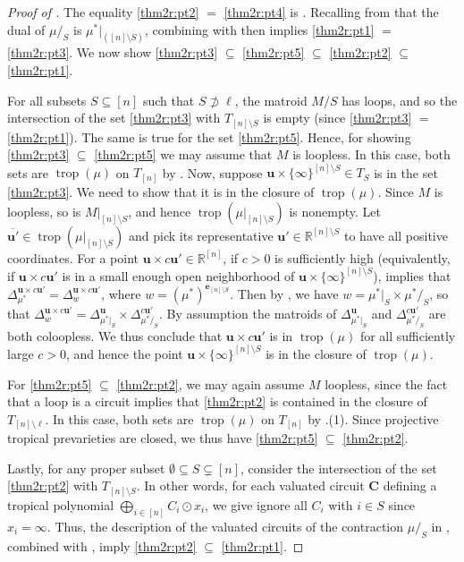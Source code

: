 \documentclass[11pt]{amsart}
\newcommand{\RR}{\mathbb R}
\newcommand{\trop}{\operatorname{trop}}
\newcommand{\be}{\mathbf e}
\newcommand{\bu}{{\mathbf u}}
\theoremstyle{definition}
\begin{document}
\begin{proof}[Proof of ] The equality \ref{thm2r:pt2} $=$ \ref{thm2r:pt4} is \cite[Theorem 3.8]{MT01}.  Recalling from  that the dual of $\mu/_S$ is $\mu^*|_{([n]\setminus S)}$, combining  with  then  implies \ref{thm2r:pt1} $=$ \ref{thm2r:pt3}.
We now show \ref{thm2r:pt3} $\subseteq$ \ref{thm2r:pt5} $\subseteq$ \ref{thm2r:pt2} $\subseteq$ \ref{thm2r:pt1}.

For all subsets $S\subseteq [n]$ such that $S\not\supset\ell$, the matroid $M/S$ has loops, and so the intersection of the set \ref{thm2r:pt3} with $T_{[n]\setminus S}$ is empty (since \ref{thm2r:pt3} $=$ \ref{thm2r:pt1}).  The same is true for the set \ref{thm2r:pt5}.  Hence, for showing \ref{thm2r:pt3} $\subseteq$ \ref{thm2r:pt5} we may assume that $M$ is loopless.  In this case, both sets are $\trop(\mu)$ on $T_{[n]}$ by .  Now, suppose $\bu \times \{\infty\}^{[n]\setminus S} \in T_{S}$ is in the set \ref{thm2r:pt3}.  We need to show that it is in the closure of $\trop(\mu)$.  Since $M$ is loopless, so is $M|_{[n]\setminus S}$, and hence $\trop(\mu|_{[n]\setminus S})$ is nonempty.  Let $\overline{\bu'} \in \trop(\mu|_{[n]\setminus S})$ and pick its representative $\bu'\in \RR^{[n]\setminus S}$ to have all positive coordinates.  For a point $\bu \times c\bu' \in \RR^{[n]}$, if $c>0$ is sufficiently high (equivalently, if $\bu \times c\bu'$ is in a small enough open neighborhood of $\bu \times \{\infty\}^{[n]\setminus S}$),  implies that $\Delta_{\mu^*}^{\bu \times c\bu'} = \Delta_{w}^{\bu \times c\bu'}$, where $w = (\mu^*)^{\be_{[n]\setminus S}}$.  Then by , we have $w = \mu^*|_S \times \mu^*/_S$, so that $\Delta_{w}^{\bu \times c\bu'} = \Delta_{\mu^*|_S}^{\bu} \times \Delta_{\mu^*/_S}^{c\bu'}$.  By assumption the matroids of $\Delta_{\mu^*|_S}^{\bu}$ and $\Delta_{\mu^*/_S}^{c\bu'}$ are both coloopless.  We thus conclude that $\bu\times c\bu'$ is in $\trop(\mu)$ for all sufficiently large $c>0$, and hence the point $\bu \times \{\infty\}^{[n]\setminus S}$ is in the closure of $\trop(\mu)$.

For \ref{thm2r:pt5} $\subseteq$ \ref{thm2r:pt2}, we may again assume $M$ loopless, since the fact that a loop is a circuit implies that \ref{thm2r:pt2} is contained in the closure of $T_{[n]\setminus \ell}$.  In this case, both sets are $\trop(\mu)$ on $T_{[n]}$ by .(1).  Since projective tropical prevarieties are closed, we thus have \ref{thm2r:pt5} $\subseteq$ \ref{thm2r:pt2}.

Lastly, for any proper subset $\emptyset \subseteq S \subsetneq [n]$, consider the intersection of the set \ref{thm2r:pt2} with $T_{[n]\setminus S}$.  In other words, for each valuated circuit $\mathbf C$ defining a tropical polynomial $\bigoplus_{i\in [n]} C_i \odot x_i$, we give ignore all $C_i$ with $i\in S$ since $x_i = \infty$.  Thus, the description of the valuated circuits of the contraction $\mu/_S$ in , combined with , imply \ref{thm2r:pt2} $\subseteq$ \ref{thm2r:pt1}.
\end{proof}
\end{document}
